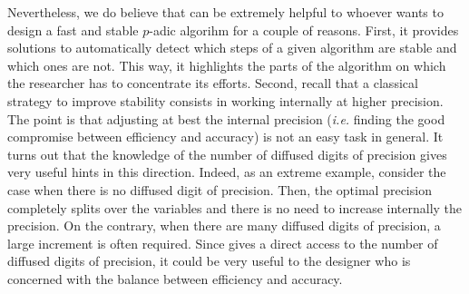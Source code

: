 \documentclass[sigconf]{acmart}
\newcommand{\ZpL}{\text{\color{output} \rm \tt ZpL}\xspace}
\theoremstyle{definition}
\begin{document}
Nevertheless, we do believe that \ZpL can be extremely helpful to 
whoever wants to design a fast and stable $p$-adic algorihm for a couple 
of reasons. First, it provides solutions 
to automatically detect which steps of a given algorithm are stable and 
which ones are not. This way, it highlights the parts of the algorithm 
on which the researcher has to concentrate its efforts.
Second, recall that a classical strategy to improve stability consists 
in working internally at higher precision. The point is that adjusting 
at best the internal precision (\emph{i.e.} finding the good compromise 
between efficiency and accuracy) is not an easy task in general. It 
turns out that the knowledge of the number of diffused digits of 
precision gives very useful hints in this direction. Indeed, as an 
extreme example, consider the case when there is no diffused digit of 
precision. Then, the optimal precision completely splits over the
variables and there is no need to increase internally the precision. On 
the contrary, when there are many diffused digits of precision, a large 
increment is often required.
Since \ZpL gives a direct access to the number of diffused digits of 
precision, it could be very useful to the designer who is concerned
with the balance between efficiency and accuracy.
\end{document}
